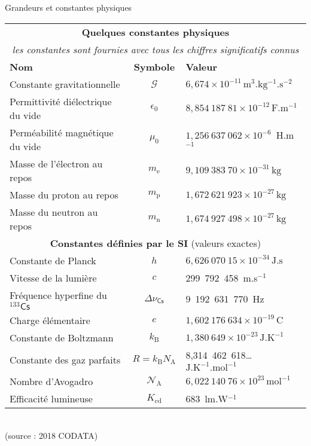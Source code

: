 {Grandeurs et constantes physiques} \\[2ex]

\begin{center}
    \begin{tabular}{@{} p{6cm}cl @{}} %
       \toprule
	   \multicolumn{3}{c}{\textbf{Quelques constantes physiques}}   \\
	   \multicolumn{3}{c}{\emph{les constantes sont fournies avec tous les chiffres significatifs connus}}   \\
	         
	   \cmidrule(r){1-3} %
       \textbf{Nom}						&\textbf{Symbole}& \textbf{Valeur}\\
	   Constante gravitationnelle		&\(\mathcal{G}\)	&\(6{,}674\times 10^{-11}\,\mathrm{m^{3}.kg^{-1}.s^{-2}}\)\\
	   Permittivité diélectrique du vide&\(\epsilon_0\)	&\(8{,}854~187~81\times 10^{-12}\,\mathrm{F.m^{-1}}\)\\
	   Perméabilité magnétique du vide	&\(\mu_{0}\)		&\(1{,}256~637~062\times 10^{-6}\)~H.m\(^{-1}\)\\	  
	   Masse de l'électron au repos		&\(m_\text{e}\)	&\(9{,}109~383~70\times 10^{-31}\,\mathrm{kg}\)\\
	   Masse du proton au repos			&\(m_\text{p}\)	&\(1{,}672~621~923\times10^{-27}\,\mathrm{kg} \)\\
	   Masse du neutron au repos		&\(m_\text{n}\)	&\(1{,}674~927~498\times10^{-27}\,\mathrm{kg} \)\\
	   \midrule
	   \multicolumn{3}{c}{\textbf{Constantes définies par le SI} (valeurs exactes)}   \\      
	   \midrule
	   Constante de Planck				&\(h\)			&\(6{,}626~070~15\times 10^{-34}\,\mathrm{J.s}\)\\
	   Vitesse de la lumière			&\(c\)			&299~792~458~m.s\(^{-1}\)\\
	   Fréquence hyperfine du \(^{133}\textsf{Cs}\)&\(\Delta\nu_\textsf{Cs}\)&9~192~631~770~Hz\\
	   Charge élémentaire				&\(e\)			&\(1{,}602~176~634\times 10^{-19}\,\mathrm{C}\)\\	   
	   Constante de Boltzmann			&\(k_\text{B}\)		&\(1{,}380~649\times 10^{-23}\,\mathrm{J.K^{-1}} \)\\
	   Constante des gaz parfaits&\(R=k_\text{B}N_\text{A}\)	&8,314~462~618\ldots\(\mathrm{J.K^{-1}.mol^{-1}} \)\\
	   Nombre d'Avogadro	&\(\mathcal{N}_\text{A}\)	&\(6{,}022~140~76\times 10^{23}\,\mathrm{mol^{-1}}\)\\
	   Efficacité lumineuse 			&\(K_\text{cd}\)	&683~lm.W\(^{-1}\)\\
 	  \bottomrule
    \end{tabular}\\[1.5ex](source : 2018 CODATA)
\end{center}

